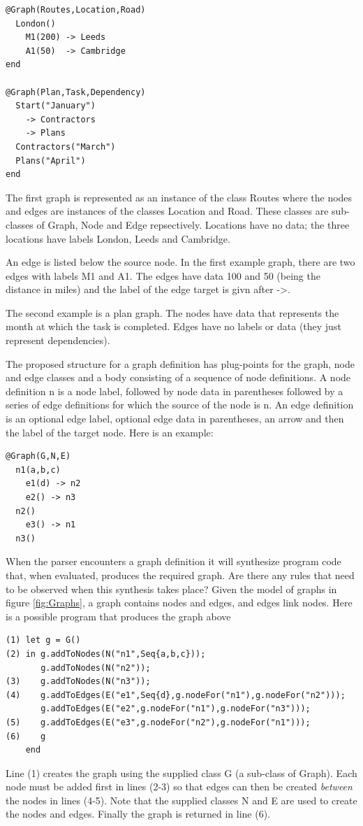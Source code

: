 \begin{lstlisting}
@Graph(Routes,Location,Road)
  London()
    M1(200) -> Leeds
    A1(50)  -> Cambridge
end

@Graph(Plan,Task,Dependency)
  Start("January")
    -> Contractors
    -> Plans
  Contractors("March")
  Plans("April")
end
\end{lstlisting}The first graph is represented as an instance of the class Routes
where the nodes and edges are instances of the classes Location and
Road. These classes are sub-classes of Graph, Node and Edge repsectively.
Locations have no data; the three locations have labels London, Leeds
and Cambridge. 

An edge is listed below the source node. In the first example graph,
there are two edges with labels M1 and A1. The edges have data 100
and 50 (being the distance in miles) and the label of the edge target
is givn after ->.

The second example is a plan graph. The nodes have data that represents
the month at which the task is completed. Edges have no labels or
data (they just represent dependencies).

The proposed structure for a graph definition has plug-points for
the graph, node and edge classes and a body consisting of a sequence
of node definitions. A node definition n is a node label, followed
by node data in parentheses followed by a series of edge definitions
for which the source of the node is n. An edge definition is an optional
edge label, optional edge data in parentheses, an arrow and then the
label of the target node. Here is an example:

\begin{lstlisting}
@Graph(G,N,E)
  n1(a,b,c)
    e1(d) -> n2
    e2() -> n3
  n2()
    e3() -> n1
  n3()
\end{lstlisting}When the parser encounters a graph definition it will synthesize program
code that, when evaluated, produces the required graph. Are there
any rules that need to be observed when this synthesis takes place?
Given the model of graphs in figure \ref{fig:Graphs}, a graph contains
nodes and edges, and edges link nodes. Here is a possible program
that produces the graph above\begin{lstlisting}
(1) let g = G()
(2) in g.addToNodes(N("n1",Seq{a,b,c}));
       g.addToNodes(N("n2"));
(3)    g.addToNodes(N("n3"));
(4)    g.addToEdges(E("e1",Seq{d},g.nodeFor("n1"),g.nodeFor("n2")));
       g.addToEdges(E("e2",g.nodeFor("n1"),g.nodeFor("n3")));
(5)    g.addToEdges(E("e3",g.nodeFor("n2"),g.nodeFor("n1")));
(6)    g
    end
\end{lstlisting}Line (1) creates the graph using the supplied class G (a sub-class
of Graph). Each node must be added first in lines (2-3) so that edges
can then be created \textit{between} the nodes in lines (4-5). Note
that the supplied classes N and E are used to create the nodes and
edges. Finally the graph is returned in line (6).

